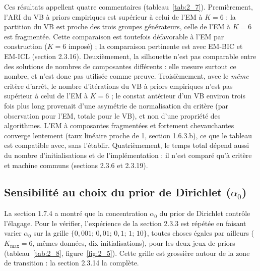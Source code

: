 Ces résultats appellent quatre commentaires (tableau~\ref{tab:2_7}). Premièrement, l'ARI du VB à priors empiriques est supérieur à celui de l'EM à $K=6$ : la partition du VB est proche des trois groupes générateurs, celle de l'EM à $K=6$ est fragmentée. Cette comparaison est toutefois défavorable à l'EM par construction ($K=6$ imposé) ; la comparaison pertinente est avec EM-BIC et EM-ICL (section 2.3.16). Deuxièmement, la silhouette n'est pas comparable entre des solutions de nombres de composantes différents : elle mesure surtout ce nombre, et n'est donc pas utilisée comme preuve. Troisièmement, avec le \emph{même} critère d'arrêt, le nombre d'itérations du VB à priors empiriques n'est pas supérieur à celui de l'EM à $K=6$ ; le constat antérieur d'un VB environ trois fois plus long provenait d'une asymétrie de normalisation du critère (par observation pour l'EM, totale pour le VB), et non d'une propriété des algorithmes. L'EM à composantes fragmentées et fortement chevauchantes converge lentement (taux linéaire proche de 1, section 1.6.3.b), ce que le tableau est compatible avec, sans l'établir. Quatrièmement, le temps total dépend aussi du nombre d'initialisations et de l'implémentation : il n'est comparé qu'à critère et machine communs (sections 2.3.6 et 2.3.19).

\subsection{Sensibilité au choix du prior de Dirichlet ($\alpha _{0}$)}
La section 1.7.4 a montré que la concentration $\alpha_0$ du prior de Dirichlet contrôle l'élagage. Pour le vérifier, l'expérience de la section 2.3.3 est répétée en faisant varier $\alpha_0$ sur la grille $\{0{,}001;\,0{,}01;\,0{,}1;\,1;\,10\}$, toutes choses égales par ailleurs ($K_{\max}=6$, mêmes données, dix initialisations), pour les deux jeux de priors (tableau~\ref{tab:2_8}, figure~\ref{fig:2_5}). Cette grille est grossière autour de la zone de transition : la section 2.3.14 la complète.

